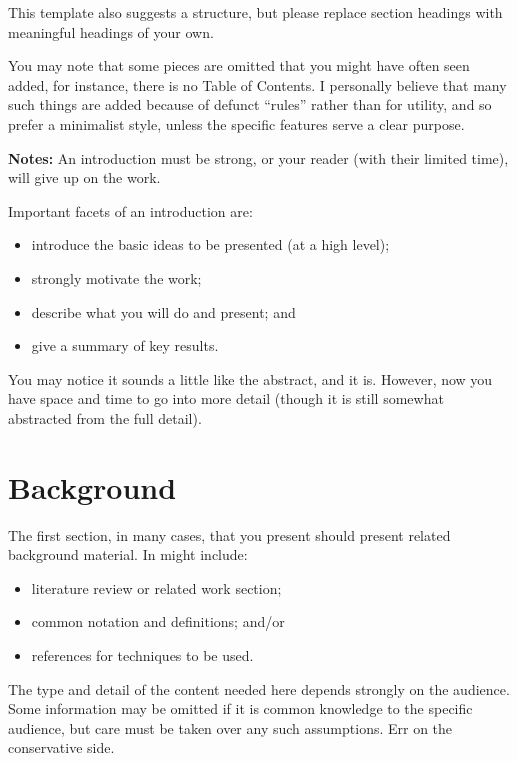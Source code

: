 \documentclass[12pt,a4paper]{article}
\begin{document}
This template also suggests a structure, but please replace section
headings with meaningful headings of your own. 

You may note that some pieces are omitted that you might have often
seen added, for instance, there is no Table of Contents. I personally
believe that many such things are added because of defunct ``rules''
rather than for utility, and so prefer a minimalist style, unless the
specific features serve a clear purpose. 

\noindent \hrulefill

{\bf Notes:}
An introduction must be strong, or your reader (with their limited
time), will give up on the work.

Important facets of an introduction are:
  \begin{itemize}
  \item introduce the basic ideas to be presented (at a high level);
  \item strongly motivate the work; 
  \item describe what you will do and present; and 
  \item give a summary of key results.
  \end{itemize}
 
You may notice it sounds a little like the abstract, and it
is. However, now you have space and time to go into more detail
(though it is still somewhat abstracted from the full detail).


\clearpage
\section{Background}

The first section, in many cases, that you present should present
related background material. In might include:
\begin{itemize}
\item literature review or related work section;
\item common notation and definitions; and/or
\item references for techniques to be used.
\end{itemize}

The type and detail of the content needed here depends strongly on the
audience. Some information may be omitted if it is common knowledge to
the specific audience, but care must be taken over any such
assumptions. Err on the conservative side.

\vspace{10mm}
\noindent \hrulefill
\end{document}
